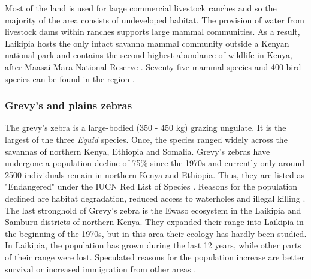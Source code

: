 \documentclass[12pt,a4paper, twoside, english]{article}
\begin{document}
Most of the land is used for large commercial livestock ranches \citep{Sundaresan2008, Sundaresan2012} and so the majority of the area consists of undeveloped habitat. The provision of water from livestock dams within ranches supports large mammal communities. As a result, Laikipia hosts the only intact savanna mammal community outside a Kenyan national park and contains the second highest abundance of wildlife in Kenya, after Maasai Mara National Reserve \citep{Evans2016a}. Seventy-five mammal species and 400 bird species can be found in the region \citep{Shorrocks2014}. 


\subsubsection{Grevy's and plains zebras}

The grevy's zebra is a large-bodied (350 - 450 kg) grazing ungulate. It is the largest of the three \textit{Equid} species. Once, the species ranged widely across the savannas of northern Kenya, Ethiopia and Somalia. Grevy's zebras have undergone a population decline of 75\% since the 1970s and currently only around 2500 individuals remain in northern Kenya and Ethiopia. Thus, they are listed as "Endangered" under the IUCN Red List of Species \citep{Moehlman2013}. Reasons for the population declined are habitat degradation, reduced access to waterholes and illegal killing \citep{Moehlman2002}. The last stronghold of Grevy's zebra is the Ewaso ecosystem in the Laikipia and Samburu districts of northern Kenya. They expanded their range into Laikipia in the beginning of the 1970s, but in this area their ecology has hardly been studied. In Laikipia, the population has grown during the last 12 years, while other parts of their range were lost. Speculated reasons for the population increase are better survival or increased immigration from other areas \citep{Moehlman2002, Sundaresan2008, Sundaresan2012}. 
\end{document}
